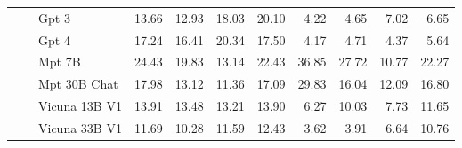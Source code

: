 \begin{table}[ht]
\begin{tabular}{l|l|l|rrrr|rrrr}
 &  & Gpt 3 & {\cellcolor[HTML]{FDDEDB}} \color[HTML]{000000} 13.66 & {\cellcolor[HTML]{FDE1DE}} \color[HTML]{000000} 12.93 & {\cellcolor[HTML]{FCCECA}} \color[HTML]{000000} 18.03 & {\cellcolor[HTML]{FCC6C2}} \color[HTML]{000000} 20.10 & {\cellcolor[HTML]{F6FCFD}} \color[HTML]{000000} 4.22 & {\cellcolor[HTML]{F5FBFD}} \color[HTML]{000000} 4.65 & {\cellcolor[HTML]{F1FAFC}} \color[HTML]{000000} 7.02 & {\cellcolor[HTML]{F2FAFC}} \color[HTML]{000000} 6.65 \\
 &  & Gpt 4 & {\cellcolor[HTML]{FCD1CD}} \color[HTML]{000000} 17.24 & {\cellcolor[HTML]{FDD4D0}} \color[HTML]{000000} 16.41 & {\cellcolor[HTML]{FCC6C1}} \color[HTML]{000000} 20.34 & {\cellcolor[HTML]{FCD0CC}} \color[HTML]{000000} 17.50 & {\cellcolor[HTML]{F6FCFD}} \color[HTML]{000000} 4.17 & {\cellcolor[HTML]{F5FBFD}} \color[HTML]{000000} 4.71 & {\cellcolor[HTML]{F6FCFD}} \color[HTML]{000000} 4.37 & {\cellcolor[HTML]{F4FBFC}} \color[HTML]{000000} 5.64 \\
 &  & Mpt 7B & {\cellcolor[HTML]{FBB0BA}} \color[HTML]{000000} 24.43 & {\cellcolor[HTML]{FCC7C3}} \color[HTML]{000000} 19.83 & {\cellcolor[HTML]{FDE1DE}} \color[HTML]{000000} 13.14 & {\cellcolor[HTML]{FBBABD}} \color[HTML]{000000} 22.43 & {\cellcolor[HTML]{8DD3C0}} \color[HTML]{000000} 36.85 & {\cellcolor[HTML]{BAE5DC}} \color[HTML]{000000} 27.72 & {\cellcolor[HTML]{EBF7FA}} \color[HTML]{000000} 10.77 & {\cellcolor[HTML]{D1EEE9}} \color[HTML]{000000} 22.27 \\
 &  & Mpt 30B Chat & {\cellcolor[HTML]{FCCECA}} \color[HTML]{000000} 17.98 & {\cellcolor[HTML]{FDE1DE}} \color[HTML]{000000} 13.12 & {\cellcolor[HTML]{FDE6E2}} \color[HTML]{000000} 11.36 & {\cellcolor[HTML]{FCD1CD}} \color[HTML]{000000} 17.09 & {\cellcolor[HTML]{B0E1D6}} \color[HTML]{000000} 29.83 & {\cellcolor[HTML]{E0F3F5}} \color[HTML]{000000} 16.04 & {\cellcolor[HTML]{E8F6FA}} \color[HTML]{000000} 12.09 & {\cellcolor[HTML]{DEF2F4}} \color[HTML]{000000} 16.80 \\
 &  & Vicuna 13B V1 & {\cellcolor[HTML]{FDDDDA}} \color[HTML]{000000} 13.91 & {\cellcolor[HTML]{FDDFDC}} \color[HTML]{000000} 13.48 & {\cellcolor[HTML]{FDE0DD}} \color[HTML]{000000} 13.21 & {\cellcolor[HTML]{FDDDDA}} \color[HTML]{000000} 13.90 & {\cellcolor[HTML]{F2FAFC}} \color[HTML]{000000} 6.27 & {\cellcolor[HTML]{ECF8FA}} \color[HTML]{000000} 10.03 & {\cellcolor[HTML]{F0F9FB}} \color[HTML]{000000} 7.73 & {\cellcolor[HTML]{E9F7FA}} \color[HTML]{000000} 11.65 \\
 &  & Vicuna 33B V1 & {\cellcolor[HTML]{FDE5E2}} \color[HTML]{000000} 11.69 & {\cellcolor[HTML]{FEE9E6}} \color[HTML]{000000} 10.28 & {\cellcolor[HTML]{FDE5E2}} \color[HTML]{000000} 11.59 & {\cellcolor[HTML]{FDE3E0}} \color[HTML]{000000} 12.43 & {\cellcolor[HTML]{F7FCFD}} \color[HTML]{000000} 3.62 & {\cellcolor[HTML]{F7FCFD}} \color[HTML]{000000} 3.91 & {\cellcolor[HTML]{F2FAFC}} \color[HTML]{000000} 6.64 & {\cellcolor[HTML]{EBF7FA}} \color[HTML]{000000} 10.76 \\

\end{tabular}
\end{table}
